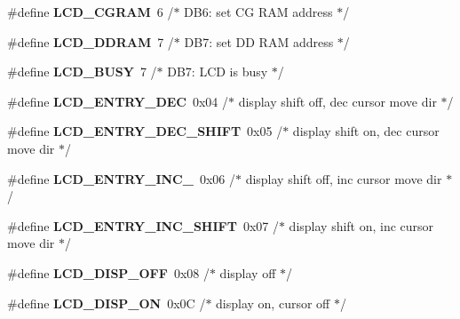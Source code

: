 \begin{DoxyCompactItemize}
\item 
\#define {\bfseries L\+C\+D\+\_\+\+C\+G\+R\+AM}~6 /$\ast$ D\+B6\+: set CG R\+AM address             $\ast$/\hypertarget{a00006_ga3b38de74c362be1781fef1136aa9684c}{}\label{a00006_ga3b38de74c362be1781fef1136aa9684c}

\item 
\#define {\bfseries L\+C\+D\+\_\+\+D\+D\+R\+AM}~7 /$\ast$ D\+B7\+: set DD R\+AM address             $\ast$/\hypertarget{a00006_gae54acf3ccc45b7d6be334a03627740c6}{}\label{a00006_gae54acf3ccc45b7d6be334a03627740c6}

\item 
\#define {\bfseries L\+C\+D\+\_\+\+B\+U\+SY}~7 /$\ast$ D\+B7\+: L\+CD is busy                    $\ast$/\hypertarget{a00006_gac8dd1658e235f174d1cabae5c438943d}{}\label{a00006_gac8dd1658e235f174d1cabae5c438943d}

\item 
\#define {\bfseries L\+C\+D\+\_\+\+E\+N\+T\+R\+Y\+\_\+\+D\+EC}~0x04 /$\ast$ display shift off, dec cursor move dir $\ast$/\hypertarget{a00006_gaad56f8e07634e85663f56888ae97089c}{}\label{a00006_gaad56f8e07634e85663f56888ae97089c}

\item 
\#define {\bfseries L\+C\+D\+\_\+\+E\+N\+T\+R\+Y\+\_\+\+D\+E\+C\+\_\+\+S\+H\+I\+FT}~0x05 /$\ast$ display shift on,  dec cursor move dir $\ast$/\hypertarget{a00006_ga1c62932f252c6262cbef728add9696e4}{}\label{a00006_ga1c62932f252c6262cbef728add9696e4}

\item 
\#define {\bfseries L\+C\+D\+\_\+\+E\+N\+T\+R\+Y\+\_\+\+I\+N\+C\+\_\+}~0x06 /$\ast$ display shift off, inc cursor move dir $\ast$/\hypertarget{a00006_gad27ddc4b8d03594662c8757f946dde28}{}\label{a00006_gad27ddc4b8d03594662c8757f946dde28}

\item 
\#define {\bfseries L\+C\+D\+\_\+\+E\+N\+T\+R\+Y\+\_\+\+I\+N\+C\+\_\+\+S\+H\+I\+FT}~0x07 /$\ast$ display shift on,  inc cursor move dir $\ast$/\hypertarget{a00006_gafabd0215cc6ae5539dc638dbec44a506}{}\label{a00006_gafabd0215cc6ae5539dc638dbec44a506}

\item 
\#define {\bfseries L\+C\+D\+\_\+\+D\+I\+S\+P\+\_\+\+O\+FF}~0x08 /$\ast$ display off                            $\ast$/\hypertarget{a00006_gaa2966175115943883f51e9c90478540c}{}\label{a00006_gaa2966175115943883f51e9c90478540c}

\item 
\#define {\bfseries L\+C\+D\+\_\+\+D\+I\+S\+P\+\_\+\+ON}~0x0\+C /$\ast$ display on, cursor off                 $\ast$/\hypertarget{a00006_ga5163a96b133868975c0738e180b30cb8}{}\label{a00006_ga5163a96b133868975c0738e180b30cb8}


\end{DoxyCompactItemize}
